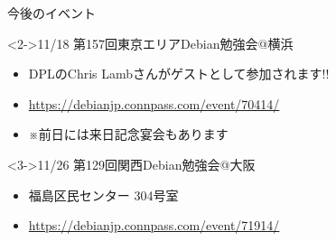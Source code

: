 \documentclass[cjk,c,squeeze,shrink,dvipdfmx,12pt]{beamer}
\begin{document}
\begin{frame}[fragile]{今後のイベント}
  \begin{block}<2->{11/18 第157回東京エリアDebian勉強会@横浜}
    \begin{itemize}
    \item \alert{DPLのChris Lambさんがゲストとして参加されます!!}
    \item \url{https://debianjp.connpass.com/event/70414/}
    \item ※前日には来日記念宴会もあります
    \end{itemize}
  \end{block}
  \vfill
  \begin{block}<3->{11/26 第129回関西Debian勉強会@大阪}
    \begin{itemize}
    \item 福島区民センター 304号室
    \item \url{https://debianjp.connpass.com/event/71914/}
    \end{itemize}
  \end{block}
  \vfill
\end{frame}
\fi
{}

\takahashi[80]{　}
\end{document}
